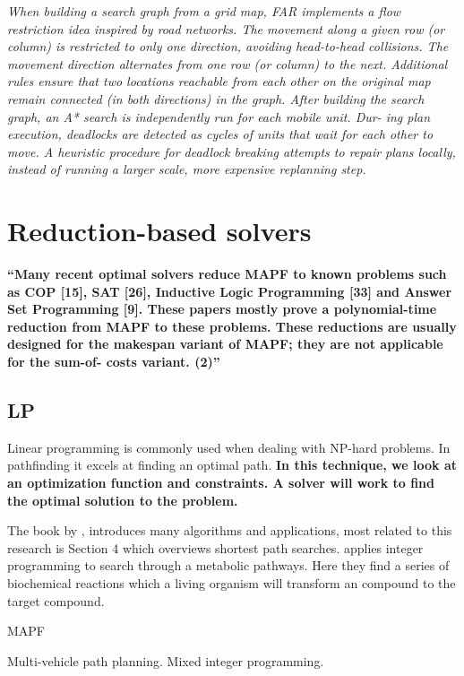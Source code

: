 \documentclass[a4paper,11pt]{article}
\begin{document}
\textit{When building a search graph from a grid map, FAR implements a flow restriction idea inspired by road networks. The movement along a given row (or column) is restricted to only one direction, avoiding head-to-head collisions. The movement direction alternates from one row (or column) to the next. Additional rules ensure that two locations reachable from each other on the original map remain connected (in both directions) in the graph. After building the search graph, an A* search is independently run for each mobile unit. Dur- ing plan execution, deadlocks are detected as cycles of units that wait for each other to move. A heuristic procedure for deadlock breaking attempts to repair plans locally, instead of running a larger scale, more expensive replanning step.}




\section{Reduction-based solvers}

\textbf{\cite{surynek2016efficient} ``Many recent optimal solvers reduce MAPF to known problems such as COP [15], SAT [26], Inductive Logic Programming [33] and Answer Set Programming [9]. These papers mostly prove a polynomial-time reduction from MAPF to these problems. These reductions are usually designed for the makespan variant of MAPF; they are not applicable for the sum-of- costs variant.
(2)''}

\subsection{LP}
Linear programming is commonly used when dealing with NP-hard problems. In pathfinding it excels at finding an optimal path. \textbf{In this technique, we look at an optimization function and constraints. A solver will work to find the optimal solution to the problem.}

The book by \cite{ahuja1993network}, introduces many algorithms and applications, most related to this research is Section 4 which overviews shortest path searches. \cite{planes2009path} applies integer programming to search through a metabolic pathways. Here they find a series of biochemical reactions which a living organism will transform an compound to the target compound.

MAPF

\cite{schouwenaars2001mixed} Multi-vehicle path planning. Mixed integer programming.
\end{document}
